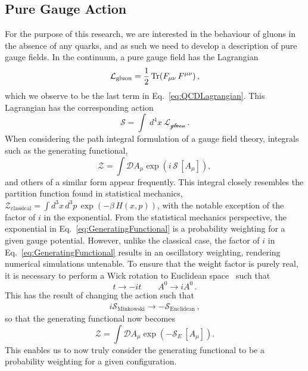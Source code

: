 \subsection{Pure Gauge Action}
For the purpose of this research, we are interested in the behaviour of gluons in the absence of any quarks, and as such we need to develop a description of pure gauge fields. In the continuum, a pure gauge field has the Lagrangian~\cite{ryder1996quantum}
%
\begin{equation}
\mathcal{L}_{\text{gluon}}=\frac{1}{2}\operatorname{Tr}(F_{\mu\nu}\,F^{\mu\nu})\, ,
\label{eq:GaugeLagrangian}
\end{equation}
%
which we observe to be the last term in Eq.~\eqref{eq:QCDLagrangian}. This Lagrangian has the corresponding action
%
\begin{equation}
\mathcal{S}=\int~d^4x~\mathcal{L_\text{gluon}}\, .
\label{eq:QCDAction}
\end{equation}
%
When considering the path integral formulation of a gauge field theory, integrals such as the generating functional,
%
\begin{equation}
\mathcal{Z} =\int \mathcal{D} A_\mu \exp\left(i\,\mathcal{S}\,[A_\mu]\right),
\label{eq:GeneratingFunctional}
\end{equation}
%
and others of a similar form appear frequently. This integral closely resembles the partition function found in statistical mechanics, $\mathcal{Z}_{\text{classical}}=\int d^3x\,d^3p\,\exp\left(-\beta\,H(x,p)\right)$, with the notable exception of the factor of $i$ in the exponential. From the statistical mechanics perspective, the exponential in Eq.~\eqref{eq:GeneratingFunctional} is a probability weighting for a given gauge potential. However, unlike the classical case, the factor of $i$ in Eq.~\eqref{eq:GeneratingFunctional} results in an oscillatory weighting, rendering numerical simulations untenable. To ensure that the weight factor is purely real, it is necessary to perform a Wick rotation to Euclidean space~\cite{Schafer:1996wv,Wilson:1974sk} such that
\begin{equation*}
t \rightarrow -it \qquad A^0 \rightarrow iA^0\, .
\end{equation*}
%
This has the result of changing the action such that
%
\begin{align*}
i\mathcal{S}_\text{Minkowski} \rightarrow -\mathcal{S}_\text{Euclidean}\, ,
\end{align*} 
so that the generating functional now becomes 
%
\begin{equation}
\mathcal{Z}=\int \mathcal{D} A_\mu \exp\left(-\mathcal{S}_E\,[A_\mu]\right).
\end{equation}
%
This enables us to now truly consider the generating functional to be a probability weighting for a given configuration.\\

